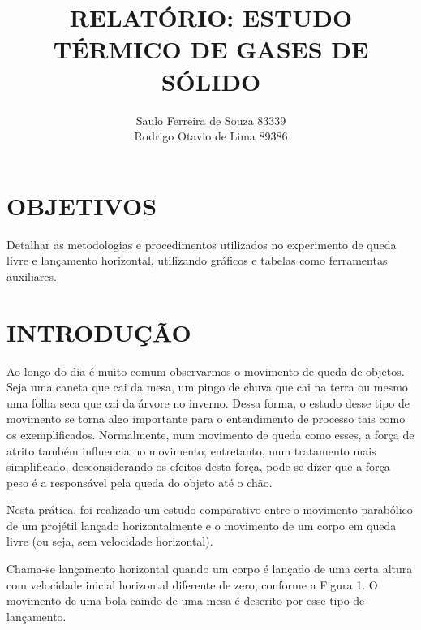 \documentclass[10pt]{article}
\begin{document}
	

\title{\uppercase{\textbf{Relatório: Estudo térmico de gases de sólido}}}
\author{Saulo Ferreira de Souza 83339 \protect\\ Rodrigo Otavio de Lima 89386}
\maketitle

\setlength{\parindent}{2cm}

\section{OBJETIVOS}

Detalhar as metodologias e procedimentos utilizados no experimento de queda livre e lançamento horizontal, utilizando gráficos e tabelas como ferramentas auxiliares.

\section{INTRODUÇÃO}

Ao longo do dia é muito comum observarmos o movimento de queda de objetos. Seja uma caneta que cai da mesa, um pingo de chuva que cai na terra ou mesmo uma folha seca que cai da árvore no inverno. Dessa forma, o estudo desse tipo de movimento se torna algo importante para o  entendimento  de  processo tais  como os  exemplificados.  Normalmente,  num  movimento  de queda  como  esses,  a  força  de  atrito  também  influencia  no  movimento;  entretanto,  num  tratamento mais simplificado, desconsiderando os efeitos desta força, pode-se dizer que a força peso é a responsável pela queda do objeto até o chão. 

Nesta prática, foi realizado um estudo comparativo entre o movimento parabólico de um projétil lançado  horizontalmente  e o movimento de  um corpo em queda livre  (ou seja, sem velocidade horizontal).

Chama-se lançamento horizontal quando um corpo é lançado de uma certa altura com velocidade inicial horizontal diferente de  zero, conforme  a  Figura 1. O  movimento de  uma  bola  caindo de 
uma mesa é descrito por esse tipo de lançamento.
\end{document}
